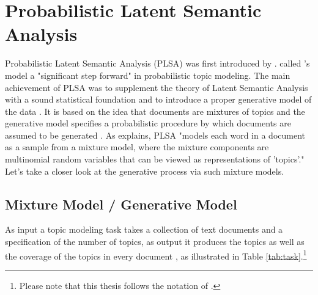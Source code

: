 \documentclass[11pt,a4paper,english,oneside]{book}
\numberwithin{equation}{chapter}
\begin{document}
\section{Probabilistic Latent Semantic Analysis}\label{PLSA}
Probabilistic Latent Semantic Analysis (PLSA) was first introduced by \cite{Hofmann.1999}. \citet[p.~994]{Blei.2003} called \citeauthor{Hofmann.1999}'s model a "significant step forward" in probabilistic topic modeling. The main achievement of PLSA was to supplement the theory of Latent Semantic Analysis with a sound statistical foundation and to introduce a proper generative model of the data \cite[p. 289]{Hofmann.1999}. It is based on the idea that documents are mixtures of topics and the generative model specifies a probabilistic procedure by which documents are assumed to be generated \cite[p.~2]{Steyvers(2007)}. As \citet[p. 994]{Blei.2003} explains, PLSA "models each word in a document as a sample from a mixture model, where the mixture components are multinomial random variables that can be viewed as representations of 'topics'." Let's take a closer look at the generative process via such mixture models.


\subsection{Mixture Model / Generative Model}
As input a topic modeling task takes a collection of text documents and a specification of the number of topics, as output it produces the topics as well as the coverage  of the topics in every document \cite[pp.~330--331]{Zhai.2016}, as illustrated in Table \ref{tab:task}.\footnote{Please note that this thesis follows the notation of \cite{Zhai.2016}.} 
	
\end{document}
